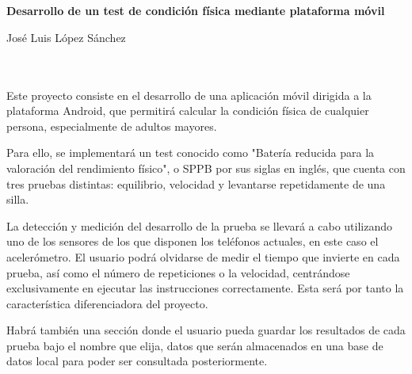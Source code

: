 \chapter*{}






\cleardoublepage
\thispagestyle{empty}

\begin{center}
{\large\bfseries Desarrollo de un test de condición física mediante plataforma móvil}\\
\end{center}
\begin{center}
José Luis López Sánchez\\
\end{center}

\\

\vspace{0.7cm}
\\

Este proyecto consiste en el desarrollo de una aplicación móvil dirigida a la plataforma Android, que permitirá calcular la condición física de cualquier persona, especialmente de adultos mayores.

Para ello, se implementará un test conocido como "Batería reducida para la valoración del rendimiento físico", o SPPB por sus siglas en inglés, que cuenta con tres pruebas distintas: equilibrio, velocidad y levantarse repetidamente de una silla. 

La detección y medición del desarrollo de la prueba se llevará a cabo utilizando uno de los sensores de los que disponen los teléfonos actuales, en este caso el acelerómetro. El usuario podrá olvidarse de medir el tiempo que invierte en cada prueba, así como el número de repeticiones o la velocidad, centrándose exclusivamente en ejecutar las instrucciones correctamente. Esta será por tanto la característica diferenciadora del proyecto.

Habrá también una sección donde el usuario pueda guardar los resultados de cada prueba bajo el nombre que elija, datos que serán almacenados en una base de datos local para poder ser consultada posteriormente.

